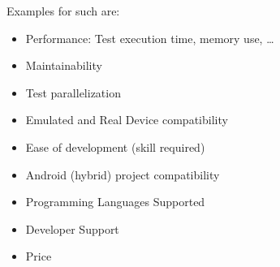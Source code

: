 Examples for such are: 
	\begin{itemize}
  		\vspace{-0.4cm}\item Performance: Test execution time, memory use, …
		\vspace{-0.4cm}\item Maintainability
		\vspace{-0.4cm}\item Test parallelization
		\vspace{-0.4cm}\item Emulated and Real Device compatibility
		\vspace{-0.4cm}\item Ease of development (skill required)
		\vspace{-0.4cm}\item Android (hybrid) project compatibility
		\vspace{-0.4cm}\item Programming Languages Supported
		\vspace{-0.4cm}\item Developer Support
		\vspace{-0.4cm}\item Price
	\end{itemize}

